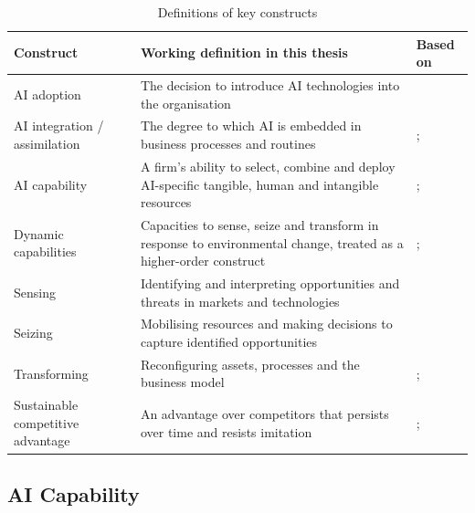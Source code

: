 \begin{table}[htbp]
\centering
\caption{Definitions of key constructs}
\label{tab:constructs}
\footnotesize
\renewcommand{\arraystretch}{1.1}\setlength{\tabcolsep}{4pt}
\begin{tabularx}{\textwidth}{|>{\raggedright\arraybackslash}p{3.1cm}|>{\raggedright\arraybackslash}X|>{\raggedright\arraybackslash}p{3.2cm}|}
\hline
\textbf{Construct} & \textbf{Working definition in this thesis} & \textbf{Based on} \\
\hline
AI adoption & The decision to introduce AI technologies into the organisation & \textcite{chatterjee2021} \\ \hline
AI integration / assimilation & The degree to which AI is embedded in business processes and routines & \textcite{fossowamba2022}; \textcite{selgascors2026} \\ \hline
AI capability & A firm's ability to select, combine and deploy AI-specific tangible, human and intangible resources & \textcite{mikalef2021ai}; \textcite{fossowamba2024} \\ \hline
Dynamic capabilities & Capacities to sense, seize and transform in response to environmental change, treated as a higher-order construct & \textcite{teece1997}; \textcite{teece2007} \\ \hline
Sensing & Identifying and interpreting opportunities and threats in markets and technologies & \textcite{teece2007} \\ \hline
Seizing & Mobilising resources and making decisions to capture identified opportunities & \textcite{teece2007} \\ \hline
Transforming & Reconfiguring assets, processes and the business model & \textcite{teece2007}; \textcite{warner2019} \\ \hline
Sustainable competitive advantage & An advantage over competitors that persists over time and resists imitation & \textcite{barney1991}; \textcite{peteraf1993} \\
\hline
\end{tabularx}
\end{table}

\subsection{AI Capability}
\label{sec:aicap}


